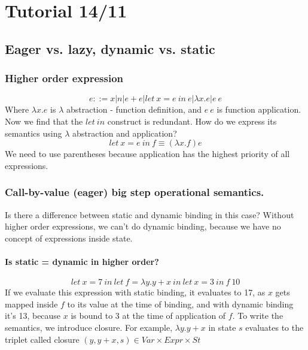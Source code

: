 \documentclass{article}
\begin{document}
\section{Tutorial 14/11}
\subsection{Eager vs. lazy, dynamic vs. static}
\subsubsection{Higher order expression}
$$e::=x|n|e+e|let\ x=e\ in\ e | \lambda x.e|e\ e$$
Where $ \lambda x.e $ is $\lambda$ abstraction - function definition, and $e\ e$ is function application.
Now we find that the $let\ in$ construct is redundant. How do we express its semantics using $ \lambda $ abstraction and application?
$$let\ x = e\ in\ f \equiv (\lambda x.f) e$$
We need to use parentheses because application has the highest priority of all expressions.
\subsubsection{Call-by-value (eager) big step operational semantics.}
Is there a difference between static and dynamic binding in this case?
Without higher order expressions, we can't do dynamic binding, because we have no concept of expressions inside state. 
\paragraph{Is static = dynamic in higher order?}
$$let\ x=7\ in \ let \ f=\lambda y.y+x\ in\ let\ x=3\ in \ f\ 10$$
If we evaluate this expression with static binding, it evaluates to 17, as $ x $ gets mapped inside $ f $ to its value at the time of binding, and with dynamic binding it's 13, because $ x $ is bound to 3 at the time of application of $ f $.
To write the semantics, we introduce closure. For example, $ \lambda y.y+x $ in state $ s $ evaluates to the triplet called closure $ (y, y+x, s) \in Var\times Expr\times St$
\end{document}
